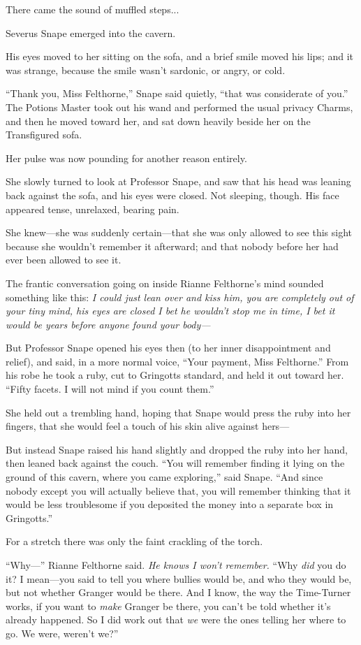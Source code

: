 There came the sound of muffled steps...

Severus Snape emerged into the cavern.

His eyes moved to her sitting on the sofa, and a brief smile moved his lips; and it was strange, because the smile wasn’t sardonic, or angry, or cold.

“Thank you, Miss Felthorne,” Snape said quietly, “that was considerate of you.” The Potions Master took out his wand and performed the usual privacy Charms, and then he moved toward her, and sat down heavily beside her on the Transfigured sofa.

Her pulse was now pounding for another reason entirely.

She slowly turned to look at Professor Snape, and saw that his head was leaning back against the sofa, and his eyes were closed. Not sleeping, though. His face appeared tense, unrelaxed, bearing pain.

She knew—she was suddenly certain—that she was only allowed to see this sight because she wouldn’t remember it afterward; and that nobody before her had ever been allowed to see it.

The frantic conversation going on inside Rianne Felthorne’s mind sounded something like this: \emph{I could just lean over and kiss him, you are completely out of your tiny mind, his eyes are closed I bet he wouldn’t stop me in time, I bet it would be years before anyone found your body—}

But Professor Snape opened his eyes then (to her inner disappointment and relief), and said, in a more normal voice, “Your payment, Miss Felthorne.” From his robe he took a ruby, cut to Gringotts standard, and held it out toward her. “Fifty facets. I will not mind if you count them.”

She held out a trembling hand, hoping that Snape would press the ruby into her fingers, that she would feel a touch of his skin alive against hers—

But instead Snape raised his hand slightly and dropped the ruby into her hand, then leaned back against the couch. “You will remember finding it lying on the ground of this cavern, where you came exploring,” said Snape. “And since nobody except you will actually believe that, you will remember thinking that it would be less troublesome if you deposited the money into a separate box in Gringotts.”

For a stretch there was only the faint crackling of the torch.

“Why—” Rianne Felthorne said. \emph{He knows I won’t remember.} “Why \emph{did} you do it? I mean—you said to tell you where bullies would be, and who they would be, but not whether Granger would be there. And I know, the way the Time-Turner works, if you want to \emph{make} Granger be there, you can’t be told whether it’s already happened. So I did work out that \emph{we} were the ones telling her where to go. We were, weren’t we?”


